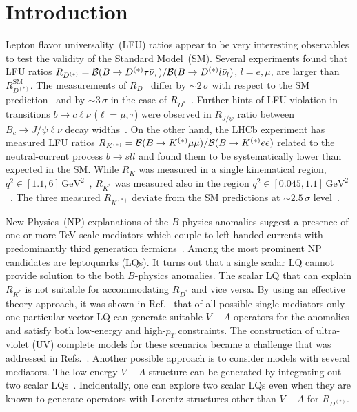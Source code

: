 \documentclass[aps,prd,superscriptaddress,twocolumn,secnumarabic]{revtex4-1}
\newcommand{\cb}{{\cal{B}}}
\newcommand{\e}[1]{\,\mathrm{#1}}
\begin{document}
\section{Introduction}
\label{sec:intro}
Lepton flavor universality~(LFU) ratios appear to be very interesting observables to test the validity of the Standard Model~(SM).
Several experiments found that LFU ratios
$R_{D^{(*)}} = { \cb( B \to D^{(*)} \tau \bar\nu_\tau)}/{\cb( B \to
  D^{(*)}  l \bar\nu_l)}$, $l= e,\mu$, are larger than
$R_{D^{(*)}}^\mathrm{SM}$. The measurements of
$R_{D}$~\cite{Lees:2013uzd,Hirose:2016wfn,Aaij:2015yra} differ
by $\sim 2\,\sigma$ with respect to the SM prediction~\cite{Lattice:2015rga} and by $\sim 3\,\sigma$ in the case of $R_{D^{\ast}}$~\cite{Fajfer:2012vx,Bernlochner:2017jka,Bigi:2017njr}. Further
hints of LFU violation in transitions $b \to c \ell \nu$ ($\ell = \mu, \tau$) were observed in
$R_{J/\psi}$ ratio between $B_c \to J/\psi \ell \nu$ decay widths~\cite{Aaij:2017tyk}. On the other hand, the LHCb
experiment has measured LFU ratios
$R_{K^{(\ast)}} = {\cb (B\to K^{(\ast)} \mu\mu)}/{\cb ( B\to
  K^{(\ast)} e e)}$ related to the neutral-current process
$b\to s l l$ and found them to be systematically lower than expected
in the SM.  While $R_K$ was measured in a single
kinematical region, $q^2 \in [1.1,6]\e{GeV}^2$~\cite{Aaij:2014ora},
$R_{K^*}$ was measured also in the region
$q^2\in [0.045,1.1]\e{GeV}^2$~\cite{Aaij:2017vbb}. The three measured
$R_{K^{(*)}}$ deviate from the SM predictions at
$\sim 2.5\,\sigma$ level~\cite{Hiller:2003js,Bordone:2016gaq}.

New Physics~(NP) explanations of the $B$-physics anomalies suggest a presence
of one or more TeV scale mediators which couple to left-handed currents with
predominantly third generation
fermions~\cite{Bordone:2016gaq,Buttazzo:2017ixm,Bhattacharya:2014wla,Feruglio:2016gvd,Hiller:2014yaa}. Among
the most prominent NP candidates are leptoquarks (LQs). 
It turns out that a single scalar LQ cannot provide solution to the both $B$-physics anomalies. The scalar LQ that can explain $R_{K^\ast}$ is not suitable for accommodating  $R_{D^\ast}$ and vice versa. 
By using an 
effective theory approach, it was shown in
Ref.~\cite{Buttazzo:2017ixm} that of all possible single mediators
only one particular vector LQ can generate suitable $V\!-\!A$
operators for the anomalies and satisfy both low-energy and high-$p_T$
constraints. The construction of ultra-violet (UV) complete models for
these scenarios became a challenge that was addressed in
Refs.~\cite{Assad:2017iib,Bordone:2018nbg,Bordone:2017bld,Greljo:2018tuh,DiLuzio:2017vat,Blanke:2018sro,Calibbi:2017qbu}. Another
possible approach is to consider models with several mediators. The low
energy $V\!-\!A$ structure can be generated by integrating out
two scalar
LQs~\cite{Buttazzo:2017ixm,Crivellin:2017zlb,Marzocca:2018wcf}. Incidentally, one can
explore two scalar LQs even when they are known to generate operators
with Lorentz structures other than $V\!-\!A$ for
$R_{D^{(*)}}$. 
\end{document}
